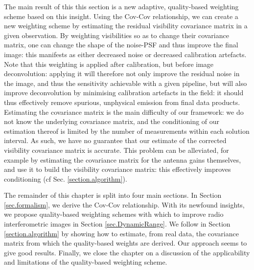 \pg
The main result of this this section is a new adaptive, quality-based weighting scheme based on this insight. Using the Cov-Cov relationship, we can {create a new} weighting scheme by estimating the residual visibility covariance matrix in a given observation. By weighting {visibilities} so as to change their covariance matrix, one can change the shape of the noise-PSF and thus improve {the final image}: this manifests as either decreased noise or decreased calibration artefacts. Note that this weighting is applied after calibration, but before image deconvolution: applying it will therefore not only improve the residual noise in the image, and thus the sensitivity achievable with a given pipeline, but will also improve deconvolution by minimising calibration artefacts in the field: it should thus effectively remove spurious, unphysical emission from final data products. Estimating the covariance matrix is the main difficulty of our framework: we do not know the underlying covariance matrix, and the conditioning of our estimation thereof is limited by the number of measurements within each {solution interval}. As such, we have no guarantee that our estimate of the corrected visibility covariance matrix is accurate. This problem can be alleviated, for example {by estimating the covariance matrix for the antenna gains themselves}, and use {it} to build the visibility covariance matrix: this effectively improves conditioning (cf Sec. \ref{section.algorithm}). 

\pg
The remainder of this chapter is split into four main sections. In Section \ref{sec.formalism}, we derive the Cov-Cov relationship. With its newfound insights, we propose quality-based weighting schemes with which to improve radio interferometric images in Section \ref{sec.DynamicRange}. We follow in Section \ref{section.algorithm} by showing how to estimate, from real data, the covariance matrix from which the quality-based weights are derived. Our approach seems to give good results. Finally, we close the chapter on a discussion of the applicability and limitations of the quality-based weighting scheme.



